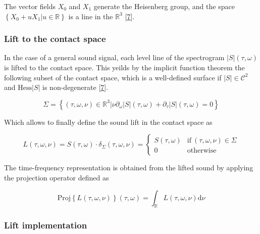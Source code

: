 \documentclass[
  american,
]{article}
\begin{document}
The vector fields \(X_0\) and \(X_1\) generate the Heisenberg group,
and the space \(\left\{X_0+uX_1\vert u\in\mathbb{R}\right\}\) is a line in the \(\mathbb{R}^3\) {[}\protect\hyperlink{ref-boscain2021}{7}{]}.

\hypertarget{lift-to-the-contact-space}{%
\subsubsection{Lift to the contact space}\label{lift-to-the-contact-space}}

In the case of a general sound signal, each level line of the spectrogram
\(\left\lvert S\right\rvert(\tau,\omega)\) is lifted to the contact space.
This yeilds by the implicit function theorem the following subset
of the contact space, which is a well-defined surface
if \(\left\lvert S\right\rvert\in\mathcal{C}^2\) and \(\mathrm{Hess}\left\lvert S\right\rvert\) is non-degenerate {[}\protect\hyperlink{ref-boscain2021}{7}{]}.

\begin{equation}
\Sigma = \left\{(\tau,\omega,\nu)\in\mathbb{R}^3 \vert\nu\partial_\omega\left\lvert S\right\rvert(\tau,\omega) + \partial_\tau\left\lvert S\right\rvert(\tau,\omega) = 0\right\}
\end{equation}

Which allows to finally define the sound lift in the contact space as

\begin{equation}
L(\tau,\omega,\nu) = S(\tau,\omega)\cdot\delta_\Sigma (\tau,\omega,\nu) =
\begin{cases}
S(\tau,\omega) & \text{if}~(\tau,\omega,\nu)\in\Sigma\\
0          & \text{otherwise}
\end{cases}
\end{equation}

The time-frequency representation is obtained from the lifted sound
by applying the projection operator defined as

\begin{equation}
\mathrm{Proj}\left\{L(\tau,\omega,\nu)\right\}(\tau,\omega) = \int_\mathbb{R}L(\tau,\omega,\nu)\mathrm{d}\nu
\end{equation}

\hypertarget{lift-implementation}{%
\subsubsection{Lift implementation}\label{lift-implementation}}
\end{document}
